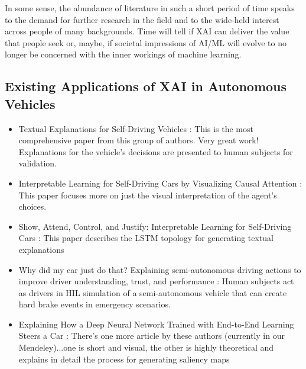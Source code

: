 In some sense, the abundance of literature in such a short period of time speaks to the demand for further research in the field and to the wide-held interest across people of many backgrounds.  Time will tell if XAI can deliver the value that people seek or, maybe, if societal impressions of AI/ML will evolve to no longer be concerned with the inner workings of machine learning.

\subsection{Existing Applications of XAI in Autonomous Vehicles}



\begin{itemize}
    \item Textual Explanations for Self-Driving Vehicles \cite{kim2018textual}: This is the most comprehensive paper from this group of authors.  Very great work!  Explanations for the vehicle's decisions are presented to human subjects for validation.

    \item Interpretable Learning for Self-Driving Cars by Visualizing Causal Attention \cite{Kim2017InterpretableLF}:  This paper focuses more on just the visual interpretation of the agent's choices.

    \item Show, Attend, Control, and Justify: Interpretable Learning for Self-Driving Cars \cite{Kim2017ShowA}: This paper describes the LSTM topology for generating textual explanations

    \item Why did my car just do that? Explaining semi-autonomous driving actions to improve driver understanding, trust, and performance \cite{Koo2015}:  Human subjects act as drivers in HIL simulation of a semi-autonomous vehicle that can create hard brake events in emergency scenarios.
    
    \item Explaining How a Deep Neural Network Trained with End-to-End Learning Steers a Car \cite{Bojarski2017ExplainingHA}: There's one more article by these authors (currently in our Mendeley)...one is short and visual, the other is highly theoretical and explains in detail the process for generating saliency maps
\end{itemize}
